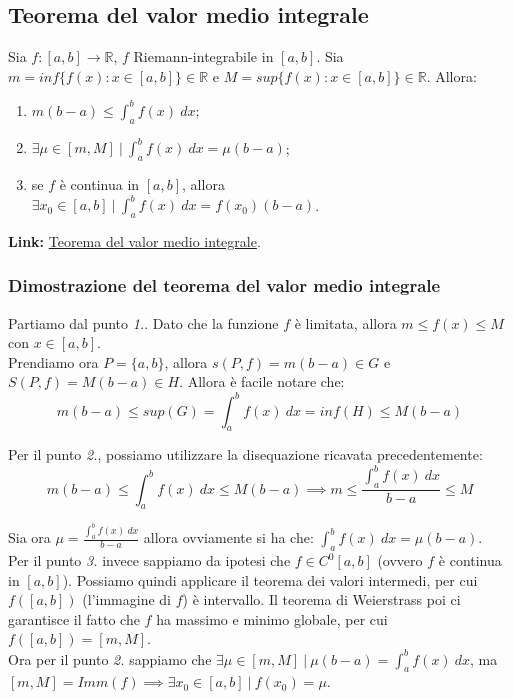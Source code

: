 \documentclass{article}
\begin{document}
\subsection{Teorema del valor medio integrale}
Sia $f: [a, b] \xrightarrow{} \mathbb{R}$, $f$ Riemann-integrabile in $[a, b]$. Sia $m = inf\{f(x) : x \in [a, b]\} \in \mathbb{R}$ e $M = sup\{f(x) : x \in [a, b]\} \in \mathbb{R}$. Allora:
\begin{enumerate}
    \item $m(b - a) \leq \int_a^b f(x) \ dx$;
    \item $\exists \mu \in [m, M] \ | \ \int_a^b f(x) \ dx = \mu(b - a)$;
    \item se $f$ è continua in $[a, b]$, allora $\exists x_0 \in [a, b] \ | \ \int_a^b f(x) \ dx = f(x_0)(b - a)$.
\end{enumerate}

\noindent\textbf{Link:} \href{https://www.geogebra.org/m/EkxYSCJh}{Teorema del valor medio integrale}. 

\subsubsection{Dimostrazione del teorema del valor medio integrale}
Partiamo dal punto \textit{1.}. Dato che la funzione $f$ è limitata, allora $m \leq f(x) \leq M$ con $x \in [a, b]$. \\
Prendiamo ora $P = \{a, b\}$, allora $s(P, f) = m(b - a) \in G$ e $S(P, f) = M(b - a) \in H$. Allora è facile notare che:
\begin{equation*}
    m(b - a) \leq sup(G) = \int_a^b f(x) \ dx = inf(H) \leq M(b -a)
\end{equation*}

\noindent Per il punto \textit{2.}, possiamo utilizzare la disequazione ricavata precedentemente:
\begin{equation*}
    m(b - a) \leq \int_a^b f(x) \ dx \leq M(b - a) \implies m \leq \frac{\int_a^b f(x) \ dx}{b - a} \leq M
\end{equation*}

\noindent Sia ora $\mu = \frac{\int_a^b f(x) \ dx}{b - a}$ allora ovviamente si ha che: $\int_a^b f(x) \ dx = \mu(b - a)$.\\
Per il punto \textit{3.} invece sappiamo da ipotesi che $f \in C^0[a, b]$ (ovvero $f$ è continua in $[a, b]$). Possiamo quindi applicare il teorema dei valori intermedi, per cui $f([a, b])$ (l'immagine di $f$) è intervallo. Il teorema di Weierstrass poi ci garantisce il fatto che $f$ ha massimo e minimo globale, per cui $f([a, b]) = [m, M]$.\\
Ora per il punto \textit{2.} sappiamo che $\exists \mu \in [m, M] \ | \ \mu(b - a) = \int_a^b f(x) \ dx$, ma $[m, M] = Imm(f) \implies \exists x_0 \in [a, b] \ | \ f(x_0) = \mu$.\\
\end{document}
